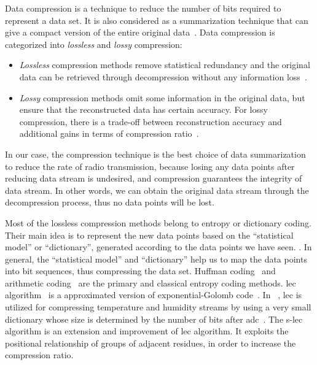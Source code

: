
Data compression is a technique to reduce the number of bits required to
represent a data set. It is also considered as a summarization technique
that can give a compact version of the entire original
data~\cite{hesabi2015data}. Data compression is categorized into
\emph{lossless} and \emph{lossy} compression:
\begin{itemize}
    \item \emph{Lossless} compression methods remove statistical redundancy and
    the original data can be retrieved through decompression without any
    information loss~\cite{hesabi2015data}.
    \item \emph{Lossy} compression methods omit some information in the original
    data, but ensure that the reconstructed data has certain accuracy. For lossy
    compression, there is a trade-off between reconstruction accuracy and
    additional gains in terms of compression ratio~\cite{zordan2014performance}.
\end{itemize}

In our case, the compression technique is the best choice of data summarization
to reduce the rate of radio transmission, because losing any data points after
reducing data stream is undesired, and compression guarantees the integrity of
data stream. In other words, we can obtain the original data stream through the
decompression process, thus no data points will be lost.

Most of the lossless compression methods belong to entropy or dictionary coding.
Their main idea is to represent the new data points based on the ``statistical
model'' or ``dictionary'', generated according to the data points we have seen.
.
In general, the ``statistical model'' and ``dictionary'' help us to map the data
points into bit sequences, thus compressing the data set. Huffman
coding~\cite{huffman1952method} and arithmetic
coding~\cite{langdon1984introduction} are the primary and classical entropy
coding methods. \acrfull{lec} algorithm~\cite{marcelloni2008simple} is a
approximated version of exponential-Golomb code~\cite{teuhola1978compression}.
In ~\cite{marcelloni2008simple}, \acrshort{lec} is utilized for compressing
temperature and humidity streams by using a very small dictionary whose size is
determined by the number of bits after
\acrfull{adc}~\cite{marcelloni2008simple,marcelloni2009efficient}. The
\acrfull{s-lec}~\cite{li2016temporal} algorithm is an extension and improvement
of \acrshort{lec} algorithm. It exploits the positional relationship of groups
of adjacent residues, in order to increase the compression ratio.

